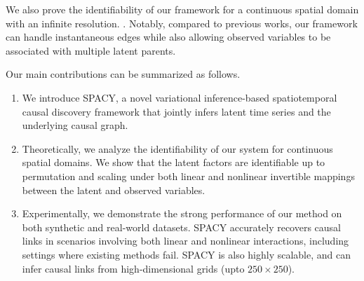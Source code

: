 We also prove the identifiability of our framework for a continuous spatial domain with an infinite resolution. . Notably, compared to previous works, our framework can handle instantaneous edges while also allowing observed variables to be associated with multiple latent parents.



Our main contributions can be summarized as follows.
\begin{enumerate}[noitemsep, topsep=0pt]
    \item We introduce SPACY, a novel variational inference-based spatiotemporal causal discovery framework that jointly infers latent time series and the underlying causal graph.
    \item Theoretically, we analyze the identifiability of our system for continuous spatial domains. We show that the latent factors are identifiable up to permutation and scaling under both linear and nonlinear invertible mappings between the latent and observed variables.
    \item Experimentally, we demonstrate the strong performance of our method on both synthetic and real-world datasets. SPACY accurately recovers causal links in scenarios involving both linear and nonlinear interactions, including settings where existing methods fail. SPACY is also highly scalable, and can infer causal links from high-dimensional grids (upto $250\times 250$).
\end{enumerate}



